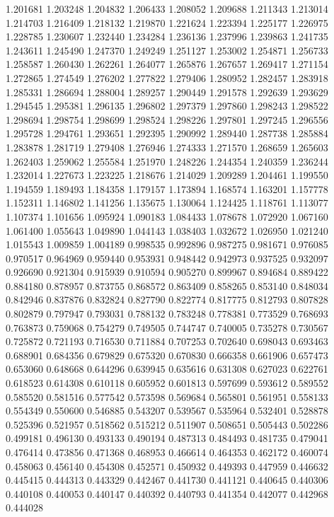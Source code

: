 1.201681
1.203248
1.204832
1.206433
1.208052
1.209688
1.211343
1.213014
1.214703
1.216409
1.218132
1.219870
1.221624
1.223394
1.225177
1.226975
1.228785
1.230607
1.232440
1.234284
1.236136
1.237996
1.239863
1.241735
1.243611
1.245490
1.247370
1.249249
1.251127
1.253002
1.254871
1.256733
1.258587
1.260430
1.262261
1.264077
1.265876
1.267657
1.269417
1.271154
1.272865
1.274549
1.276202
1.277822
1.279406
1.280952
1.282457
1.283918
1.285331
1.286694
1.288004
1.289257
1.290449
1.291578
1.292639
1.293629
1.294545
1.295381
1.296135
1.296802
1.297379
1.297860
1.298243
1.298522
1.298694
1.298754
1.298699
1.298524
1.298226
1.297801
1.297245
1.296556
1.295728
1.294761
1.293651
1.292395
1.290992
1.289440
1.287738
1.285884
1.283878
1.281719
1.279408
1.276946
1.274333
1.271570
1.268659
1.265603
1.262403
1.259062
1.255584
1.251970
1.248226
1.244354
1.240359
1.236244
1.232014
1.227673
1.223225
1.218676
1.214029
1.209289
1.204461
1.199550
1.194559
1.189493
1.184358
1.179157
1.173894
1.168574
1.163201
1.157778
1.152311
1.146802
1.141256
1.135675
1.130064
1.124425
1.118761
1.113077
1.107374
1.101656
1.095924
1.090183
1.084433
1.078678
1.072920
1.067160
1.061400
1.055643
1.049890
1.044143
1.038403
1.032672
1.026950
1.021240
1.015543
1.009859
1.004189
0.998535
0.992896
0.987275
0.981671
0.976085
0.970517
0.964969
0.959440
0.953931
0.948442
0.942973
0.937525
0.932097
0.926690
0.921304
0.915939
0.910594
0.905270
0.899967
0.894684
0.889422
0.884180
0.878957
0.873755
0.868572
0.863409
0.858265
0.853140
0.848034
0.842946
0.837876
0.832824
0.827790
0.822774
0.817775
0.812793
0.807828
0.802879
0.797947
0.793031
0.788132
0.783248
0.778381
0.773529
0.768693
0.763873
0.759068
0.754279
0.749505
0.744747
0.740005
0.735278
0.730567
0.725872
0.721193
0.716530
0.711884
0.707253
0.702640
0.698043
0.693463
0.688901
0.684356
0.679829
0.675320
0.670830
0.666358
0.661906
0.657473
0.653060
0.648668
0.644296
0.639945
0.635616
0.631308
0.627023
0.622761
0.618523
0.614308
0.610118
0.605952
0.601813
0.597699
0.593612
0.589552
0.585520
0.581516
0.577542
0.573598
0.569684
0.565801
0.561951
0.558133
0.554349
0.550600
0.546885
0.543207
0.539567
0.535964
0.532401
0.528878
0.525396
0.521957
0.518562
0.515212
0.511907
0.508651
0.505443
0.502286
0.499181
0.496130
0.493133
0.490194
0.487313
0.484493
0.481735
0.479041
0.476414
0.473856
0.471368
0.468953
0.466614
0.464353
0.462172
0.460074
0.458063
0.456140
0.454308
0.452571
0.450932
0.449393
0.447959
0.446632
0.445415
0.444313
0.443329
0.442467
0.441730
0.441121
0.440645
0.440306
0.440108
0.440053
0.440147
0.440392
0.440793
0.441354
0.442077
0.442968
0.444028
